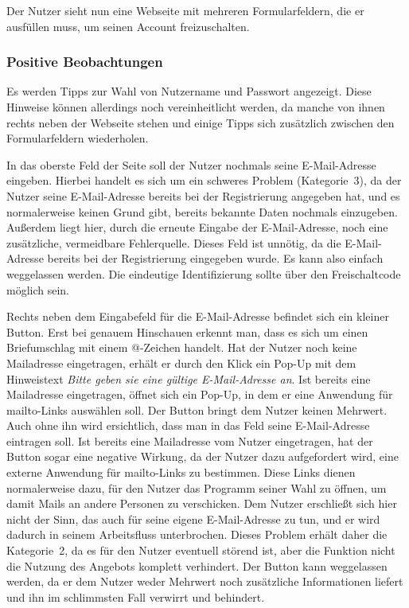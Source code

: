 Der Nutzer sieht nun eine Webseite mit mehreren Formularfeldern, die er ausfüllen muss, um seinen Account freizuschalten.

\subsubsection*{Positive Beobachtungen}
\label{subsubsec:freischaltung_webseite_positiv}
Es werden Tipps zur Wahl von Nutzername und Passwort angezeigt. Diese Hinweise können allerdings noch vereinheitlicht werden, da manche von ihnen rechts neben der Webseite stehen und einige Tipps sich zusätzlich zwischen den Formularfeldern wiederholen.

{
In das oberste Feld der Seite soll der Nutzer nochmals seine E\hbox{-}Mail-Adresse eingeben.
}
{
Hierbei handelt es sich um ein schweres Problem (Kategorie~3), da der Nutzer seine E\hbox{-}Mail-Adresse bereits bei der Registrierung angegeben hat, und es normalerweise keinen Grund gibt, bereits bekannte Daten nochmals einzugeben. Außerdem liegt hier, durch die erneute Eingabe der E\hbox{-}Mail-Adresse, noch eine zusätzliche, vermeidbare Fehlerquelle.
}
{
Dieses Feld ist unnötig, da die E\hbox{-}Mail-Adresse bereits bei der Registrierung eingegeben wurde. Es kann also einfach weggelassen werden. Die eindeutige Identifizierung sollte über den Freischaltcode möglich sein.
}
\label{prob:frei:emaileingabe}

{
Rechts neben dem Eingabefeld für die E\hbox{-}Mail-Adresse befindet sich ein kleiner Button. Erst bei genauem Hinschauen erkennt man, dass es sich um einen Briefumschlag mit einem @-Zeichen handelt. Hat der Nutzer noch keine Mailadresse eingetragen, erhält er durch den Klick ein Pop-Up mit dem Hinweistext \emph{ Bitte geben sie eine gültige E\hbox{-}Mail-Adresse an}. Ist bereits eine Mailadresse eingetragen, öffnet sich ein Pop-Up, in dem er eine Anwendung für mailto-Links auswählen soll.
}
{
Der Button bringt dem Nutzer keinen Mehrwert. Auch ohne ihn wird ersichtlich, dass man in das Feld seine E\hbox{-}Mail-Adresse eintragen soll. Ist bereits eine Mailadresse vom Nutzer eingetragen, hat der Button sogar eine negative Wirkung, da der Nutzer dazu aufgefordert wird, eine externe Anwendung für mailto-Links zu bestimmen. Diese Links dienen normalerweise dazu, für den Nutzer das Programm seiner Wahl zu öffnen, um damit Mails an andere Personen zu verschicken. Dem Nutzer erschließt sich hier nicht der Sinn, das auch für seine eigene E\hbox{-}Mail-Adresse zu tun, und er wird dadurch in seinem Arbeitsfluss unterbrochen. Dieses Problem erhält daher die Kategorie~2, da es für den Nutzer eventuell störend ist, aber die Funktion nicht die Nutzung des Angebots komplett verhindert.
}
{
Der Button kann weggelassen werden, da er dem Nutzer weder Mehrwert noch zusätzliche Informationen liefert und ihn im schlimmsten Fall verwirrt und behindert.
}
\label{prob:frei:buttonmailto}

